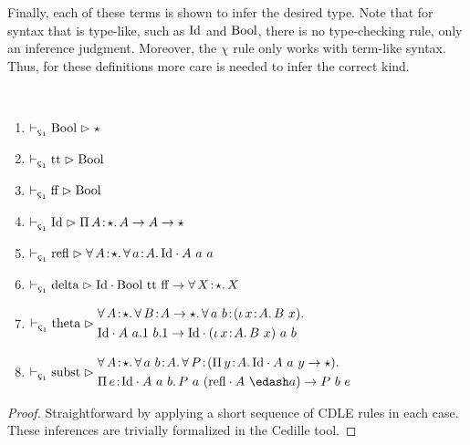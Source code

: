 Finally, each of these terms is shown to infer the desired type.
Note that for syntax that is type-like, such as $\textnormal{Id}$ and $\textnormal{Bool}$, there is no type-checking rule, only an inference judgment.
Moreover, the $\chi$ rule only works with term-like syntax.
Thus, for these definitions more care is needed to infer the correct kind.
\begin{lemma}
    \label{lem:4:c1_stuff}
    \textcolor{white}{\_}
    \begin{enumerate}
        \item $\vdash_{\oldced} \cBool \infr \star$
        \item $\vdash_{\oldced} \ctt \infr \cBool$
        \item $\vdash_{\oldced} \cff \infr \cBool$
        \item $\vdash_{\oldced} \cId \infr \abs{\Pi}{A}{\star}{A \to A \to \star}$
        \item {
            $
                \vdash_{\oldced} \crefl \infr \abs{\forall}{A}{\star}{
                    \abs{\forall}{a}{A}{
                        \cId \cdot A\ a\ a
                    }
                }
            $
        }
        \item $\vdash_{\oldced} \cdelta \infr \cId \cdot \cBool\ \ctt\ \cff \to \abs{\forall}{X}{\star}{X}$
        \item {
            $\vdash_{\oldced} \ctheta \infr
            \begin{aligned}
                 &\abs{\forall}{A}{\star}{
                    \abs{\forall}{B}{A \to \star}{
                        \abs{\forall}{a\ b}{(\abs{\iota}{x}{A}{B\ x})}{
                            \\ &\cId \cdot A\ a.1\ b.1 \to \cId \cdot (\abs{\iota}{x}{A}{B\ x})\ a\ b
                        }
                    }
                }
            \end{aligned}
            $
        }
        \item {
            $\vdash_{\oldced} \csubst \infr 
            \begin{aligned}
                &\abs{\forall}{A}{\star}{
                    \abs{\forall}{a\ b}{A}{
                        \abs{\forall}{P}{ (\abs{\Pi}{y}{A}{\cId \cdot A\ a\ y \to \star}) }{
                            \\ &\abs{\Pi}{e}{\cId \cdot A\ a\ b}{
                                P\ a\ (\crefl \cdot A\ \edash a) \to P\ b\ e
                            }
                        }
                    }
                }
            \end{aligned}
            $
        }
    \end{enumerate}
\end{lemma}
\begin{proof}
    Straightforward by applying a short sequence of CDLE rules in each case.
    These inferences are trivially formalized in the Cedille tool.
\end{proof}

